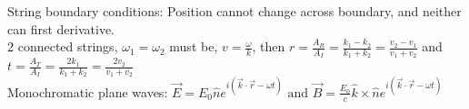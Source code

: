 \documentclass{report}
\begin{document}
String boundary conditions: Position cannot change across boundary, and neither can first derivative. \\
2 connected strings, $\omega_1 = \omega_2$ must be, $ v = \frac{\omega}{k}$, then $r = \frac{A_R}{A_I} = \frac{k_1-k_2}{k_1+k_2} = \frac{v_2-v_1}{v_1+v_2}$ and $ t = \frac{A_T}{A_I} = \frac{2k_1}{k_1+k_2} = \frac{2v_2}{v_1+v_2}$ \\
Monochromatic plane waves: $\vec{E} = E_0 \hat{n} e^{i(\vec{k}\cdot\vec{r}-\omega t)} \text{ and } \vec{B} = \frac{E_0}{c} \hat{k} \times \hat{n} e^{i(\vec{k}\cdot\vec{r}-\omega t)} $





 
\end{document}
